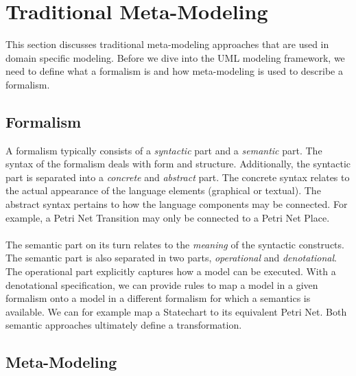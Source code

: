 \section{Traditional Meta-Modeling}

This section discusses traditional meta-modeling approaches that are used in domain specific modeling. Before we dive into the UML modeling framework, we need to define what a formalism is and how meta-modeling is used to describe a formalism.

\subsection{Formalism}

A formalism typically consists of a \textit{syntactic} part and a \textit{semantic} part. The syntax of the formalism deals with form and structure. Additionally, the syntactic part is separated into a \textit{concrete} and \textit{abstract} part. The concrete syntax relates to the actual appearance of the language elements (graphical or textual). The abstract syntax pertains to how the language components may be connected. For example, a Petri Net Transition may only be connected to a Petri Net Place. \\ \\
The semantic part on its turn relates to the \textit{meaning} of the syntactic constructs. The semantic part is also separated in two parts, \textit{operational} and \textit{denotational}. The operational part explicitly captures how a model can be executed. With a denotational specification, we can provide rules to map a model in a given formalism onto a model in a different formalism for which a semantics is available. We can for example map a Statechart to its equivalent Petri Net. Both semantic approaches ultimately define a transformation.

\subsection{Meta-Modeling}


